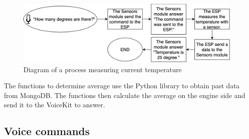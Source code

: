 \begin{figure}[H]
    \centering
    \includegraphics[width=\textwidth]{img/measure_sensors_diagram.png}
    \caption{Diagram of a process measuring current temperature}
    \label{fig:measure_sensors_diagram}
\end{figure}

The functions to determine average use the Python library to obtain past data from MongoDB. The functions then calculate the average on the engine side and send it to the VoiceKit to answer.

\subsection{Voice commands}

